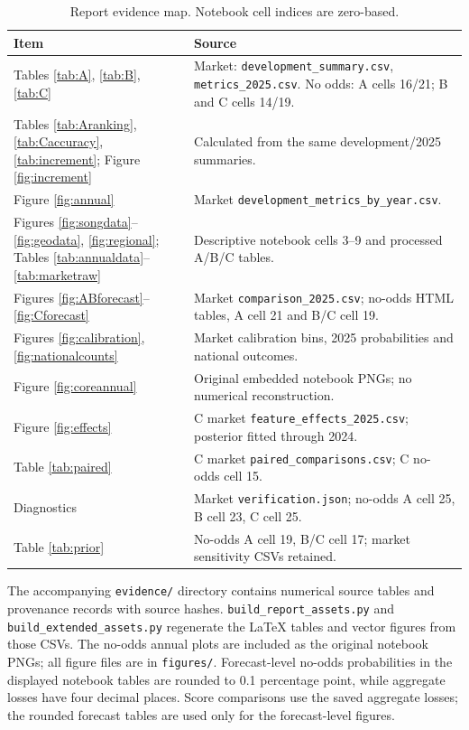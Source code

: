 \documentclass[11pt,a4paper]{article}
\begin{document}
\begin{table}[H]\centering\small
\caption{Report evidence map. Notebook cell indices are zero-based.}\label{tab:map}
\begin{tabularx}{\linewidth}{lY}
\toprule
Item & Source\\\midrule
Tables \ref{tab:A}, \ref{tab:B}, \ref{tab:C} & Market: \texttt{development\_summary.csv}, \texttt{metrics\_2025.csv}. No odds: A cells 16/21; B and C cells 14/19.\\
Tables \ref{tab:Aranking}, \ref{tab:Caccuracy}, \ref{tab:increment}; Figure \ref{fig:increment} & Calculated from the same development/2025 summaries.\\
Figure \ref{fig:annual} & Market \texttt{development\_metrics\_by\_year.csv}.\\
Figures \ref{fig:songdata}--\ref{fig:geodata}, \ref{fig:regional}; Tables \ref{tab:annualdata}--\ref{tab:marketraw} & Descriptive notebook cells 3--9 and processed A/B/C tables.\\
Figures \ref{fig:ABforecast}--\ref{fig:Cforecast} & Market \texttt{comparison\_2025.csv}; no-odds HTML tables, A cell 21 and B/C cell 19.\\
Figures \ref{fig:calibration}, \ref{fig:nationalcounts} & Market calibration bins, 2025 probabilities and national outcomes.\\
Figure \ref{fig:coreannual} & Original embedded notebook PNGs; no numerical reconstruction.\\
Figure \ref{fig:effects} & C market \texttt{feature\_effects\_2025.csv}; posterior fitted through 2024.\\
Table \ref{tab:paired} & C market \texttt{paired\_comparisons.csv}; C no-odds cell 15.\\
Diagnostics & Market \texttt{verification.json}; no-odds A cell 25, B cell 23, C cell 25.\\
Table \ref{tab:prior} & No-odds A cell 19, B/C cell 17; market sensitivity CSVs retained.\\\bottomrule
\end{tabularx}
\end{table}

The accompanying \texttt{evidence/} directory contains numerical source tables and provenance records with source hashes. \texttt{build\_report\_assets.py} and \texttt{build\_extended\_assets.py} regenerate the LaTeX tables and vector figures from those CSVs. The no-odds annual plots are included as the original notebook PNGs; all figure files are in \texttt{figures/}. Forecast-level no-odds probabilities in the displayed notebook tables are rounded to 0.1 percentage point, while aggregate losses have four decimal places. Score comparisons use the saved aggregate losses; the rounded forecast tables are used only for the forecast-level figures.
\end{document}
